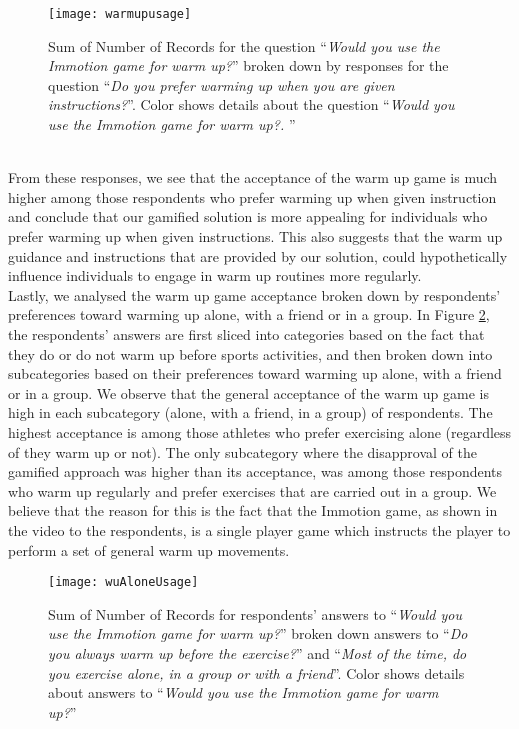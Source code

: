 \begin{figure}[h]
    \centering
    \texttt{[image: warmupusage]}
    \caption{Sum of Number of Records for the question ``\textit{Would you use the Immotion game for warm up?}'' broken down by responses for the question ``\textit{Do you prefer warming up when you are given instructions?}''. Color shows details about the question ``\textit{Would you use the Immotion game for warm up?. }''}
    \label{fig:warmupusage}
\end{figure}\\
From these responses, we see that the acceptance of the warm up game is much higher among those respondents who prefer warming up when given instruction and conclude that our gamified solution is more appealing for individuals who prefer warming up when given instructions. This also suggests that the warm up guidance and instructions that are provided by our solution, could hypothetically influence individuals to engage in warm up routines more regularly. \\
Lastly, we analysed the warm up game acceptance broken down by respondents' preferences toward warming up alone, with a friend or in a group.
In Figure \ref{fig:wuAloneUsage}, the respondents' answers are first sliced into categories based on the fact that they do or do not warm up before sports activities, and then broken down into subcategories based on their preferences toward warming up alone, with a friend or in a group. We observe that the general acceptance of the warm up game is high in each subcategory (alone, with a friend, in a group) of respondents. The highest acceptance is among those athletes who prefer exercising alone (regardless of they warm up or not). The only subcategory where the disapproval of the gamified approach was higher than its acceptance, was among those respondents who warm up regularly and prefer exercises that are carried out in a group. We believe that the reason for this is the fact that the Immotion game, as shown in the video to the respondents, is a single player game which instructs the player to perform a set of general warm up movements. \\
\begin{figure}[h]
    \centering
    \texttt{[image: wuAloneUsage]}
    \caption{Sum of Number of Records for respondents' answers to ``\textit{Would you use the Immotion game for warm up?}'' broken down answers to ``\textit{Do you always warm up before the exercise?}'' and ``\textit{Most of the time, do you exercise alone, in a group or with a friend}''. Color shows details about answers to ``\textit{Would you use the Immotion game for warm up?}''}
    \label{fig:wuAloneUsage}
\end{figure}\\
